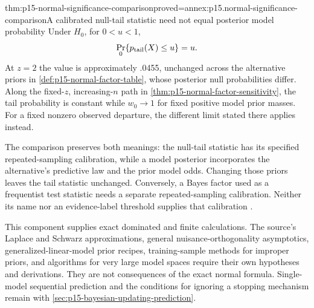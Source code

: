 \begin{hblemma}{thm:p15-normal-significance-comparison}{proved=annex:p15.normal-significance-comparison}{A calibrated null-tail statistic need not equal posterior model probability}
Under \(H_0\), for \(0<u<1\),
\[
 \Pr_0\{p_{\rm tail}(X)\leq u\}=u.
\]
At \(z=2\) the value is approximately .0455, unchanged across the
alternative priors in \cref{def:p15-normal-factor-table}, whose posterior
null probabilities differ. Along the fixed-\(z\), increasing-\(n\) path
in \cref{thm:p15-normal-factor-sensitivity}, the tail probability is
constant while \(w_0\to1\) for fixed positive model prior masses.
For a fixed nonzero observed departure, the different limit stated there
applies instead.
\end{hblemma}

The comparison preserves both meanings: the null-tail statistic has its
specified repeated-sampling calibration, while a model posterior incorporates
the alternative's predictive law and the prior model odds. Changing those
priors leaves the tail statistic unchanged. Conversely, a Bayes factor used
as a frequentist test statistic needs a separate repeated-sampling calibration.
Neither its name nor an evidence-label threshold supplies that calibration
\cite[Sec.~8.2]{KassRaftery1995BayesFactors}.

This component supplies exact dominated and finite calculations. The source's
Laplace and Schwarz approximations, general nuisance-orthogonality
asymptotics, generalized-linear-model prior recipes, training-sample methods
for improper priors, and algorithms for very large model spaces require their
own hypotheses and derivations. They are not consequences of the exact
normal formula. Single-model sequential prediction and the conditions for
ignoring a stopping mechanism remain with
\cref{sec:p15-bayesian-updating-prediction}.
